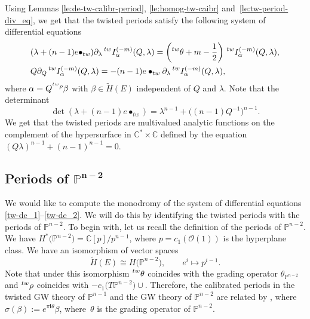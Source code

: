\documentclass[10pt,a4paper]{article}
\numberwithin{equation}{section}
\newcommand{\leftexp}[2]{{\vphantom{#2}}^{#1}{#2}}
\newcommand{\CC}{\mathbb{C}}
\newcommand{\PP}{\mathbb{P}}
\newcommand{\ii}{\mathbf{i}}
\renewcommand{\O}{\mathcal{O}}
\begin{document}
Using Lemmas \ref{le:de-tw-calibr-period}, \ref{le:homog-tw-caibr} and~\ref{le:tw-period-div_eq}, we get that the twisted periods satisfy
the following system of differential equations
\begin{align}
\label{tw-de_1}
&(\lambda+(n-1) e\bullet_{tw}) \partial_\lambda \,
\leftexp{tw}{I}^{(-m)}_\alpha(Q,\lambda) =
\left(
\leftexp{tw}{\theta}+m-\frac{1}{2}\right)\,
\leftexp{tw}{I}^{(-m)}_\alpha(Q,\lambda), \\
\label{tw-de_2}
&Q\partial_Q \,
\leftexp{tw}{I}^{(-m)}_\alpha(Q,\lambda) =
-(n-1)e\bullet_{tw}\partial_\lambda\,
\leftexp{tw}{I}^{(-m)}_\alpha(Q,\lambda),
\end{align}
where $\alpha= Q^{\leftexp{tw}{\rho}} \beta$ with $\beta\in
\widetilde{H}(E)$ independent of $Q$ and $\lambda$. Note that the
determinant
\[
\operatorname{det}(\lambda+(n-1) e\bullet_{tw}) =
\lambda^{n-1} + \big( (n-1)Q^{-1}\big) ^{n-1}.
\]
We get that the twisted periods are multivalued analytic functions on
the complement of the hypersurface in $\CC^*\times\CC$ defined by the
equation $(Q\lambda)^{n-1}+(n-1)^{n-1}=0$.

\subsection[Periods of P\^\{n-2\}]{Periods of $\boldsymbol{\PP^{n-2}}$}
\label{sec:proj_periods}

We would like to compute the monodromy of the system of differential
equations \eqref{tw-de_1}--\eqref{tw-de_2}. We will do this by
identifying the twisted periods with the periods of $\PP^{n-2}$. To
begin with, let us recall the definition of the periods of
$\PP^{n-2}$. We have $H^*\big(\PP^{n-2}\big) = \CC[p]/p^{n-1}$, where
$p=c_1(\O(1))$ is the hyperplane class. We have an isomorphism of
vector spaces
\[
\widetilde{H}(E)\cong H\big(\PP^{n-2}\big),\qquad e^i \mapsto p^{i-1}.
\]
Note that under this isomorphism $\leftexp{tw}{\theta}$ coincides with
the grading operator $\theta_{\PP^{n-2}}$ and $\leftexp{tw}{\rho}$
coincides with $-c_1\big(T\PP^{n-2}\big)\cup$. Therefore, the calibrated
periods in the twisted GW theory of $\PP^{n-1}$ and the GW theory of
$\PP^{n-2}$ are related by \smash{$e^{\leftexp{tw}{\theta} \pi\ii }
\leftexp{tw}{ \widetilde{I}_\beta^{(-m)} } (\lambda) =
\widetilde{I}^{(-m)}_{\sigma(\beta)}(\lambda)$},
where $\sigma(\beta) := e^{\pi\ii \theta } \beta$, where~$\theta$ is
the grading operator of $\PP^{n-2}$.
\end{document}
